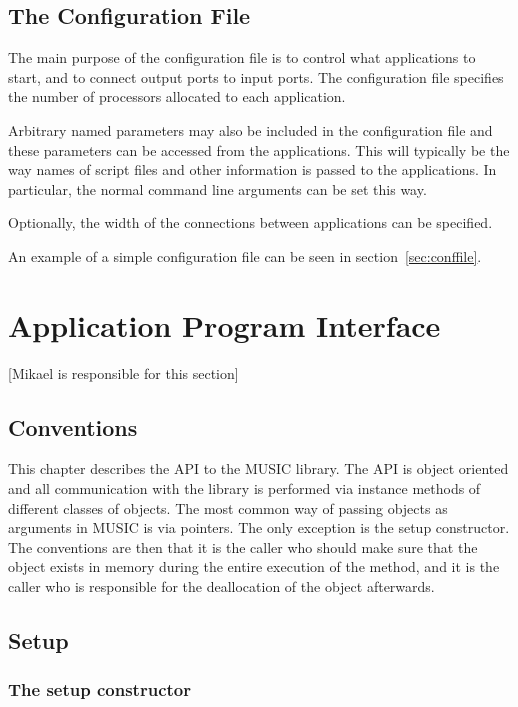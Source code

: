 \documentclass[a4paper]{report}
\newcommand{\responsible}[1]%
{{\color{red}[#1 is responsible for this section]}}
\begin{document}
\section{The Configuration File}

The main purpose of the configuration file is to control what
applications to start, and to connect output ports to input ports.
The configuration file specifies the number of processors allocated to
each application.

Arbitrary named parameters may also be included in the configuration
file and these parameters can be accessed from the applications.  This
will typically be the way names of script files and other information
is passed to the applications.  In particular, the normal command line
arguments can be set this way.

Optionally, the width of the connections between applications can be
specified.

An example of a simple configuration file can be seen in
section~\ref{sec:conffile}.


\chapter{Application Program Interface}
\responsible{Mikael}

\section{Conventions}

This chapter describes the API to the MUSIC library.  The API is
object oriented and all communication with the library is performed
via instance methods of different classes of objects.  The most common
way of passing objects as arguments in MUSIC is via pointers.  The
only exception is the setup constructor.  The conventions are then
that it is the caller who should make sure that the object exists in
memory during the entire execution of the method, and it is the caller
who is responsible for the deallocation of the object afterwards.

\section{Setup}

\subsection{The setup constructor}
\end{document}
